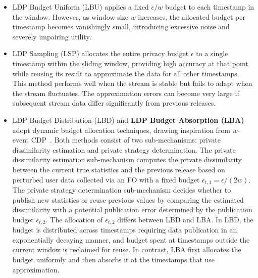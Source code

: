 \documentclass[acmsmall]{acmart}
\begin{document}
\begin{itemize}
\item {LDP Budget Uniform (LBU)} applies a fixed $\epsilon/w$ budget to each
timestamp in the window.
However, as window size $w$ increases, the allocated budget per timestamp
becomes vanishingly small, introducing excessive noise and severely impairing
utility.

\item{LDP Sampling (LSP)} allocates the entire privacy budget $\epsilon$ to a
single timestamp within the sliding window, providing high accuracy at that
point while reusing its result to approximate the data for all other timestamps.
This method performs well when the stream is stable but fails to adapt when the
stream fluctuates.
The approximation errors can become very large if subsequent stream data differ
significantly from previous releases.

\item{LDP Budget Distribution (LBD)} and \textbf{LDP Budget Absorption
  (LBA)} adopt dynamic budget allocation techniques, drawing inspiration from
$w$-event CDP~\cite{Kellaris2014}.
Both methods consist of two sub-mechanisms: private dissimilarity estimation and
private strategy determination.
The private dissimilarity estimation sub-mechanism computes the private
dissimilarity between the current true statistics and the previous release based
on perturbed user data collected via an FO with a fixed budget
$\epsilon_{t,1}=\epsilon/(2w)$.
The private strategy determination sub-mechanism decides whether to publish new
statistics or reuse previous values by comparing the estimated dissimilarity
with a potential publication error determined by the publication budget
$\epsilon_{t,2}$.
The allocation of $\epsilon_{t,2}$ differs between LBD and LBA.
In LBD, the budget is distributed across timestamps requiring data publication
in an exponentially decaying manner, and budget spent at timestamps outside the
current window is reclaimed for reuse.
In contrast, LBA first allocates the budget uniformly and then absorbs it at the
timestamps that use approximation.



\end{itemize}
\end{document}
